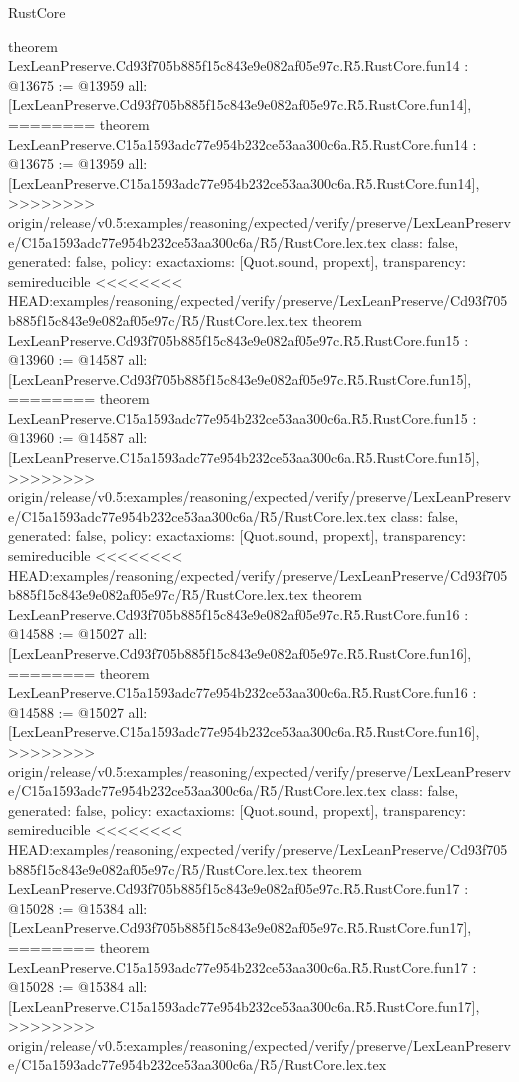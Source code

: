 \begin{lexlean}{RustCore}
\begin{coremodule}
{\begin{coremodule}
{{{{{{{{{{{{{{{{theorem LexLeanPreserve.Cd93f705b885f15c843e9e082af05e97c.R5.RustCore.fun14 : @13675 := @13959 {
  all: [LexLeanPreserve.Cd93f705b885f15c843e9e082af05e97c.R5.RustCore.fun14],
========
theorem LexLeanPreserve.C15a1593adc77e954b232ce53aa300c6a.R5.RustCore.fun14 : @13675 := @13959 {
  all: [LexLeanPreserve.C15a1593adc77e954b232ce53aa300c6a.R5.RustCore.fun14],
>>>>>>>> origin/release/v0.5:examples/reasoning/expected/verify/preserve/LexLeanPreserve/C15a1593adc77e954b232ce53aa300c6a/R5/RustCore.lex.tex
  class: false,
  generated: false,
  policy: exact{axioms: [Quot.sound, propext]},
  transparency: semireducible
}
<<<<<<<< HEAD:examples/reasoning/expected/verify/preserve/LexLeanPreserve/Cd93f705b885f15c843e9e082af05e97c/R5/RustCore.lex.tex
theorem LexLeanPreserve.Cd93f705b885f15c843e9e082af05e97c.R5.RustCore.fun15 : @13960 := @14587 {
  all: [LexLeanPreserve.Cd93f705b885f15c843e9e082af05e97c.R5.RustCore.fun15],
========
theorem LexLeanPreserve.C15a1593adc77e954b232ce53aa300c6a.R5.RustCore.fun15 : @13960 := @14587 {
  all: [LexLeanPreserve.C15a1593adc77e954b232ce53aa300c6a.R5.RustCore.fun15],
>>>>>>>> origin/release/v0.5:examples/reasoning/expected/verify/preserve/LexLeanPreserve/C15a1593adc77e954b232ce53aa300c6a/R5/RustCore.lex.tex
  class: false,
  generated: false,
  policy: exact{axioms: [Quot.sound, propext]},
  transparency: semireducible
}
<<<<<<<< HEAD:examples/reasoning/expected/verify/preserve/LexLeanPreserve/Cd93f705b885f15c843e9e082af05e97c/R5/RustCore.lex.tex
theorem LexLeanPreserve.Cd93f705b885f15c843e9e082af05e97c.R5.RustCore.fun16 : @14588 := @15027 {
  all: [LexLeanPreserve.Cd93f705b885f15c843e9e082af05e97c.R5.RustCore.fun16],
========
theorem LexLeanPreserve.C15a1593adc77e954b232ce53aa300c6a.R5.RustCore.fun16 : @14588 := @15027 {
  all: [LexLeanPreserve.C15a1593adc77e954b232ce53aa300c6a.R5.RustCore.fun16],
>>>>>>>> origin/release/v0.5:examples/reasoning/expected/verify/preserve/LexLeanPreserve/C15a1593adc77e954b232ce53aa300c6a/R5/RustCore.lex.tex
  class: false,
  generated: false,
  policy: exact{axioms: [Quot.sound, propext]},
  transparency: semireducible
}
<<<<<<<< HEAD:examples/reasoning/expected/verify/preserve/LexLeanPreserve/Cd93f705b885f15c843e9e082af05e97c/R5/RustCore.lex.tex
theorem LexLeanPreserve.Cd93f705b885f15c843e9e082af05e97c.R5.RustCore.fun17 : @15028 := @15384 {
  all: [LexLeanPreserve.Cd93f705b885f15c843e9e082af05e97c.R5.RustCore.fun17],
========
theorem LexLeanPreserve.C15a1593adc77e954b232ce53aa300c6a.R5.RustCore.fun17 : @15028 := @15384 {
  all: [LexLeanPreserve.C15a1593adc77e954b232ce53aa300c6a.R5.RustCore.fun17],
>>>>>>>> origin/release/v0.5:examples/reasoning/expected/verify/preserve/LexLeanPreserve/C15a1593adc77e954b232ce53aa300c6a/R5/RustCore.lex.tex
}}}}}}}}}}}}}}}}}}}}}
\end{coremodule}}
\end{coremodule}
\end{lexlean}
